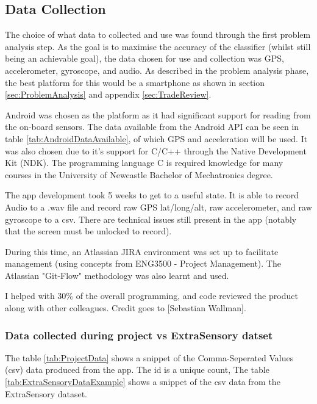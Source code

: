 \documentclass{UoNMCHA}
\numberwithin{equation}{section}
\begin{document}
\subsection{Data Collection}

The choice of what data to collected and use was found through the first problem analysis step. As the goal is to maximise the accuracy of the classifier (whilst still being an achievable goal), the data chosen for use and collection was GPS, accelerometer, gyroscope, and audio. As described in the problem analysis phase, the best platform for this would be a smartphone as shown in section \ref{sec:ProblemAnalysis} and appendix \ref{sec:TradeReview}. 


Android was chosen as the platform as it had significant support for reading from the on-board sensors. The data available from the Android API can be seen in table \ref{tab:AndroidDataAvailable}, of which GPS and acceleration will be used. It was also chosen due to it's support for C/C++ through the Native Development Kit (NDK). The programming language C is required knowledge for many courses in the University of Newcastle Bachelor of Mechatronics degree. 

The app development took 5 weeks to get to a useful state. It is able to record Audio to a .wav file and record raw GPS lat/long/alt, raw accelerometer, and raw gyroscope to a csv. There are technical issues still present in the app (notably that the screen must be unlocked to record).

During this time, an Atlassian JIRA environment was set up to facilitate management (using concepts from ENG3500 - Project Management). The Atlassian "Git-Flow" methodology was also learnt and used.

I helped with 30\% of the overall programming, and code reviewed the product along with other colleagues. Credit goes to [Sebastian Wallman].

\subsubsection{Data collected during project vs ExtraSensory datset}
The table \ref{tab:ProjectData} shows a snippet of the Comma-Seperated Values (csv) data produced from the app. The id is a unique count, %
The table \ref{tab:ExtraSensoryDataExample} shows a snippet of the csv data from the ExtraSensory dataset. 
\end{document}
